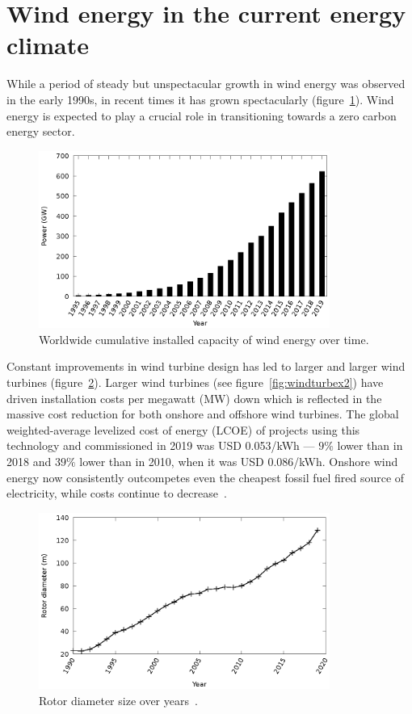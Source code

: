 \section{Wind energy in the current energy climate}
While a period of steady but unspectacular growth in wind energy was observed in the early 1990s, in recent times it has grown spectacularly (figure~\ref{fig:wind_inst_hist}). Wind energy is expected to play a crucial role in transitioning towards a zero carbon energy sector. 
\begin{figure}[h!]
\centering
\captionsetup{justification=centering}
 \includegraphics[width=0.85\textwidth]{ch1_introduction/images/wind_inst_cap_hist.eps}
\caption{Worldwide cumulative installed capacity of wind energy over time.}
 \label{fig:wind_inst_hist}
\end{figure} 
Constant improvements in wind turbine design has led to larger and larger wind turbines (figure~\ref{fig:wind_rotor}). Larger wind turbines (see figure~\ref{fig:windturbex2}) have driven installation costs per megawatt (MW) down which is reflected in the massive cost reduction for both onshore and offshore wind turbines. The global weighted-average levelized cost of energy (LCOE) of projects  using this technology and commissioned in 2019 was USD 0.053/kWh — $9\%$ lower than in 2018 and $39\%$ lower than in 2010, when it was USD 0.086/kWh. Onshore wind energy now consistently outcompetes even the cheapest fossil fuel fired source of electricity, while costs continue to decrease~\cite{irenareport}. 
\begin{figure}[h!]
\centering
\captionsetup{justification=centering}
 \includegraphics[width=0.85\textwidth]{ch1_introduction/images/wind_rotor_size.eps}
\caption{Rotor diameter size over years~\cite{rotorsize}.}
 \label{fig:wind_rotor}
\end{figure} 

